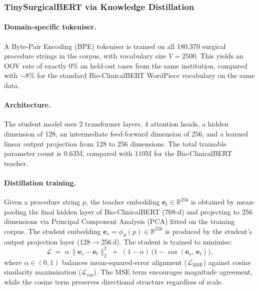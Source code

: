 \documentclass[3p]{elsarticle}
\begin{document}
\subsubsection{TinySurgicalBERT via Knowledge Distillation}
\label{sec:kd}

\paragraph{Domain-specific tokeniser.}
A Byte-Pair Encoding (BPE) tokeniser is trained on all 180,370 surgical procedure strings in the corpus, with vocabulary size $V = 2500$. This yields an OOV rate of exactly $0\%$ on held-out cases from the same institution, compared with $\sim\!8\%$ for the standard Bio-ClinicalBERT WordPiece vocabulary on the same data.

\paragraph{Architecture.}
The student model uses 2 transformer layers, 4 attention heads, a hidden dimension of 128, an intermediate feed-forward dimension of 256, and a learned linear output projection from 128 to 256 dimensions. The total trainable parameter count is $0.63\text{M}$, compared with $110\text{M}$ for the Bio-ClinicalBERT teacher.

\paragraph{Distillation training.}
Given a procedure string $p$, the teacher embedding $\mathbf{e}_t \in \mathbb{R}^{256}$ is obtained by mean-pooling the final hidden layer of Bio-ClinicalBERT (768-d) and projecting to 256 dimensions via Principal Component Analysis (PCA) fitted on the training corpus. The student embedding $\mathbf{e}_s = \phi_S(p) \in \mathbb{R}^{256}$ is produced by the student's output projection layer (128$\to$256\,d). The student is trained to minimise:
\begin{equation}
  \mathcal{L} \;=\;
    \alpha\,\bigl\lVert \mathbf{e}_s - \mathbf{e}_t \bigr\rVert_2^2
    \;+\;
    (1-\alpha)\,\bigl(1 - \cos(\mathbf{e}_s,\,\mathbf{e}_t)\bigr),
  \label{eq:kd_loss}
\end{equation}
where $\alpha \in (0,1)$ balances mean-squared-error alignment ($\mathcal{L}_{\mathrm{MSE}}$) against cosine similarity maximisation ($\mathcal{L}_{\mathrm{cos}}$). The MSE term encourages magnitude agreement, while the cosine term preserves directional structure regardless of scale.
\end{document}
